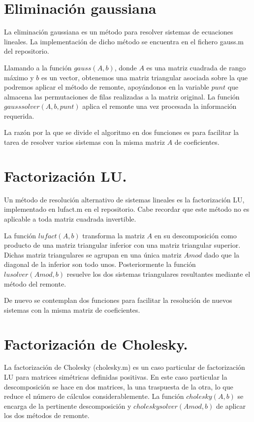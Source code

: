 \documentclass[spanish, a4paper, 12pt] {article}
\begin{document}
\section*{Eliminación gaussiana}
La eliminación gaussiana es un método para resolver sistemas de ecuaciones lineales. La implementación de dicho método se encuentra en el fichero gauss.m del repositorio.\\ \par
Llamando a la función $gauss(A, b)$, donde $A$ es una matriz cuadrada de rango máximo y $b$ es un vector, obtenemos una matriz triangular asociada sobre la que podremos aplicar el método de remonte, apoyándonos en la variable $punt$ que almacena las permutaciones de filas realizadas a la matriz original. La función $gausssolver(A, b, punt)$ aplica el remonte una vez procesada la información requerida.\\ \par
La razón por la que se divide el algoritmo en dos funciones es para facilitar la tarea de resolver varios sistemas con la misma matriz $A$ de coeficientes.
\section*{Factorización LU.}
Un método de resolución alternativo de sistemas lineales es la factorización LU, implementado en lufact.m en el repositorio. Cabe recordar que este método no es aplicable a toda matriz cuadrada invertible.\\ \par
La función $lufact(A, b)$ transforma la matriz $A$ en su descomposición como producto de una matriz triangular inferior con una matriz triangular superior. Dichas matriz triangulares se agrupan en una única matriz $Amod$ dado que la diagonal de la inferior son todo unos. Posteriormente la función $lusolver(Amod, b)$ resuelve los dos sistemas triangulares resultantes mediante el método del remonte.\\ \par
De nuevo se contemplan dos funciones para facilitar la resolución de nuevos sistemas con la misma matriz de coeficientes.
\section*{Factorización de Cholesky.}
La factorización de Cholesky (cholesky.m) es un caso particular de factorización LU para matrices simétricas definidas positivas. En este caso particular la descomposición se hace en dos matrices, la una traspuesta de la otra, lo que reduce el número de cálculos considerablemente. La función $cholesky(A, b)$ se encarga de la pertinente descomposición y $choleskysolver(Amod, b)$ de aplicar los dos métodos de remonte.
\end{document}
